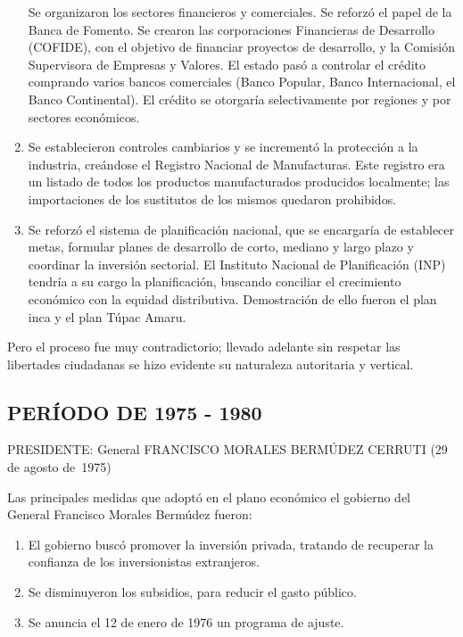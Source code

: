 \documentclass[
  letterpaper,
  DIV=11,
  numbers=noendperiod]{scrartcl}
\providecommand{\tightlist}{%
  \setlength{\itemsep}{0pt}\setlength{\parskip}{0pt}}\usepackage{longtable,booktabs,array}
\begin{document}
\begin{enumerate}
  Se organizaron los sectores financieros y comerciales. Se reforzó el
  papel de la Banca de Fomento. Se crearon las corporaciones Financieras
  de Desarrollo (COFIDE), con el objetivo de financiar proyectos de
  desarrollo, y la Comisión Supervisora de Empresas y Valores. El estado
  pasó a controlar el crédito comprando varios bancos comerciales (Banco
  Popular, Banco Internacional, el Banco Continental). El crédito se
  otorgaría selectivamente por regiones y por sectores económicos.
\item
  Se establecieron controles cambiarios y se incrementó la protección a
  la industria, creándose el Registro Nacional de Manufacturas. Este
  registro era un listado de todos los productos manufacturados
  producidos localmente; las importaciones de los sustitutos de los
  mismos quedaron prohibidos.
\item
  Se reforzó el sistema de planificación nacional, que se encargaría de
  establecer metas, formular planes de desarrollo de corto, mediano y
  largo plazo y coordinar la inversión sectorial. El Instituto Nacional
  de Planificación (INP) tendría a su cargo la planificación, buscando
  conciliar el crecimiento económico con la equidad distributiva.
  Demostración de ello fueron el plan inca y el plan Túpac Amaru.
\end{enumerate}

Pero el proceso fue muy contradictorio; llevado adelante sin respetar
las libertades ciudadanas se hizo evidente su naturaleza autoritaria y
vertical.

\hypertarget{peruxedodo-de-1975---1980}{%
\subsection{PERÍODO DE 1975 - 1980}\label{peruxedodo-de-1975---1980}}

PRESIDENTE: General FRANCISCO MORALES BERMÚDEZ CERRUTI (29 de agosto
de~1975)

Las principales medidas que adoptó en el plano económico el gobierno del
General Francisco Morales Bermúdez fueron:

\begin{enumerate}
\def\labelenumi{\arabic{enumi}.}
\tightlist
\item
  El gobierno buscó promover la inversión privada, tratando de recuperar
  la confianza de los inversionistas extranjeros.
\item
  Se disminuyeron los subsidios, para reducir el gasto público.
\item
  Se anuncia el 12 de enero de 1976 un programa de ajuste.
\end{enumerate}
\end{document}
